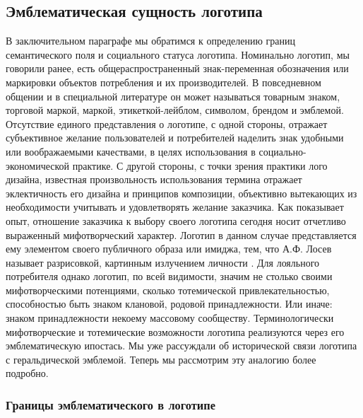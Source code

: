 \subsection{Эмблематическая сущность логотипа}

В заключительном параграфе мы обратимся к определению границ семантического поля и социального
статуса логотипа. Номинально логотип, мы говорили ранее, есть общераспространенный знак-переменная
обозначения или маркировки объектов потребления и их производителей. В повседневном общении и в
специальной литературе он может называться товарным знаком, торговой маркой, маркой,
этикеткой-лейблом, символом, брендом и эмблемой.  Отсутствие единого представления о логотипе, с
одной стороны, отражает  субъективное желание пользователей и потребителей наделить знак удобными
или воображаемыми качествами, в целях использования в социально-экономической практике. С другой
стороны, с точки зрения практики лого дизайна, известная произвольность  использования термина
отражает  эклектичность его дизайна и принципов композиции, объективно вытекающих из необходимости
учитывать и удовлетворять желание заказчика. Как показывает опыт, отношение заказчика к выбору
своего логотипа сегодня носит отчетливо выраженный мифотворческий характер. Логотип в данном случае
представляется ему элементом  своего публичного образа или имиджа, тем, что А.Ф. Лосев называет
разрисовкой, картинным излучением личности \autocite[][94]{losev1991}. Для лояльного потребителя
однако логотип, по всей видимости, значим не столько своими мифотворческими потенциями, сколько
тотемической привлекательностью, способностью быть знаком клановой, родовой
принадлежности. Или иначе: знаком принадлежности некоему массовому сообществу. Терминологически
мифотворческие и тотемические возможности логотипа реализуются через его эмблематическую ипостась.
Мы уже рассуждали об исторической связи логотипа с геральдической эмблемой.  Теперь мы рассмотрим
эту аналогию более подробно.

\subsubsection{Границы эмблематического в логотипе}

